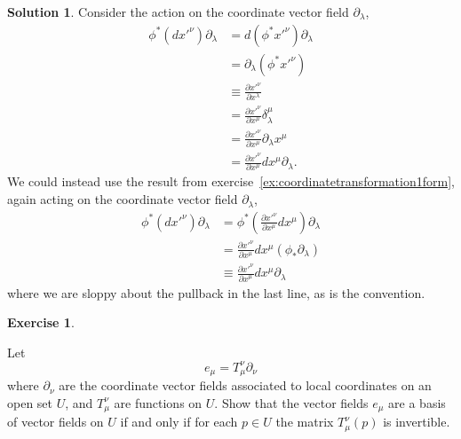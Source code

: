 \documentclass[11pt, a4paper]{report}
\theoremstyle{definition}
\newtheorem{exercise}{Exercise}[part]
\newtheorem{solution}{Solution}[part]
\newenvironment{ex}{\begin{exercise}}{\end{exercise}\pagebreak[1]}
\newenvironment{sol}{\begin{solution}}{\end{solution}\pagebreak[3]}
\newenvironment{nowidthtags}{\usetagform{nowidth}}{\ignorespacesafterend}
\begin{document}
\begin{sol}

Consider the action on the coordinate vector field $\partial_\lambda$,
\begin{nowidthtags}
\begin{align*}
    \phi^*(dx'^\nu)\partial_\lambda &= d(\phi^*x'^\nu) \partial_\lambda \\
        &= \partial_\lambda(\phi^*x'^\nu) \\
        &\equiv \frac{\partial x'^\nu}{\partial x^\lambda} \tag{``get used to it''}\\
        &= \frac{\partial x'^\nu}{\partial x^\mu} \delta_\lambda^\mu \\
        &= \frac{\partial x'^\nu}{\partial x^\mu} \partial_\lambda x^\mu \\
        &= \frac{\partial x'^\nu}{\partial x^\mu} dx^\mu \partial_\lambda.
\end{align*}
\end{nowidthtags}
We could instead use the result from exercise~\ref{ex:coordinatetransformation1form}, again acting on the coordinate vector field $\partial_\lambda$,
\begin{align*}
   \phi^*(dx'^\nu)\partial_\lambda
        &= \phi^*\left(\frac{\partial x'^\nu}{\partial x^\mu} dx^\mu \! \right) \partial_\lambda \\
        &= \frac{\partial x'^\nu}{\partial x^\mu} dx^\mu (\phi_* \partial_\lambda) \\
        &\equiv \frac{\partial x'^\nu}{\partial x^\mu} dx^\mu \partial_\lambda
\end{align*}
where we are sloppy about the pullback in the last line, as is the convention.

\end{sol}

\begin{ex}\label{ex:changebasisinvertible}

Let
\[
    e_\mu = T_\mu^\nu\partial_\nu
\]
where $\partial_\nu$ are the coordinate vector fields associated to local coordinates on an open set $U$, and $T_\mu^\nu$ are functions on $U$.
Show that the vector fields $e_\mu$ are a basis of vector fields on $U$ if and only if for each $p \in U$ the matrix $T_\mu^\nu(p)$ is invertible.

\end{ex}
\end{document}
